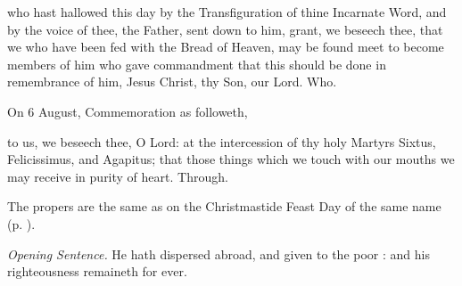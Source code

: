 
\postcommunion
{} who hast hallowed this day by the Transfiguration of thine Incarnate Word, and by the voice of thee, the Father, sent down to him, grant, we beseech thee, that we who have been fed with the Bread of Heaven, may be found meet to become members of him who gave commandment that this should be done in remembrance of him, Jesus Christ, thy Son, our Lord. Who.
\begin{rubric}
	 On 6 August, Commemoration  as followeth,
\end{rubric}
 to us, we beseech thee, O Lord: at the intercession of thy holy Martyrs Sixtus, Felicissimus, and Agapitus; that those things which we touch with our mouths we may receive in purity of heart. Through.


\begin{rubric}
    The propers are the same as on the Christmastide Feast Day of the same name (p. \pageref{MostHolyName}).
\end{rubric}


\par\noindent
\textit{Opening Sentence.} He hath dispersed abroad, and given to the poor : and his righteousness remaineth for ever.


